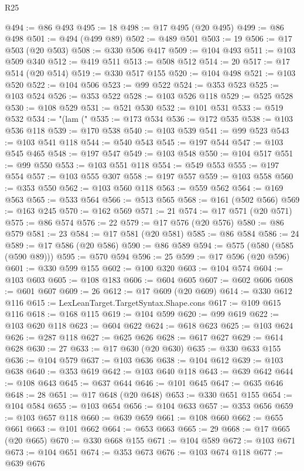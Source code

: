 \begin{lexlean}{R25}
\begin{coremodule}
@494 := @86 @493
@495 := 18
@498 := @17 @495 (@20 @495)
@499 := @86 @498
@501 := @494 (@499 @89)
@502 := @489 @501
@503 := 19
@506 := @17 @503 (@20 @503)
@508 := @330 @506 @417
@509 := @104 @493
@511 := @103 @509 @340
@512 := @419 @511
@513 := @508 @512
@514 := 20
@517 := @17 @514 (@20 @514)
@519 := @330 @517 @155
@520 := @104 @498
@521 := @103 @520
@522 := @104 @506
@523 := @99 @522
@524 := @353 @523
@525 := @103 @524
@526 := @353 @522
@528 := @103 @526 @118
@529 := @525 @528
@530 := @108 @529
@531 := @521 @530
@532 := @101 @531
@533 := @519 @532
@534 := "(lam ("
@535 := @173 @534
@536 := @172 @535
@538 := @103 @536 @118
@539 := @170 @538
@540 := @103 @539
@541 := @99 @523
@543 := @103 @541 @118
@544 := @540 @543
@545 := @197 @544
@547 := @103 @545 @465
@548 := @197 @547
@549 := @103 @548
@550 := @104 @517
@551 := @99 @550
@553 := @103 @551 @118
@554 := @549 @553
@555 := @197 @554
@557 := @103 @555 @307
@558 := @197 @557
@559 := @103 @558
@560 := @353 @550
@562 := @103 @560 @118
@563 := @559 @562
@564 := @169 @563
@565 := @533 @564
@566 := @513 @565
@568 := @161 (@502 @566)
@569 := @163 @245
@570 := @162 @569
@571 := 21
@574 := @17 @571 (@20 @571)
@575 := @86 @574
@576 := 22
@579 := @17 @576 (@20 @576)
@580 := @86 @579
@581 := 23
@584 := @17 @581 (@20 @581)
@585 := @86 @584
@586 := 24
@589 := @17 @586 (@20 @586)
@590 := @86 @589
@594 := @575 (@580 (@585 (@590 @89)))
@595 := @570 @594
@596 := 25
@599 := @17 @596 (@20 @596)
@601 := @330 @599 @155
@602 := @100 @320
@603 := @104 @574
@604 := @103 @603
@605 := @108 @183
@606 := @604 @605
@607 := @602 @606
@608 := @601 @607
@609 := 26
@612 := @17 @609 (@20 @609)
@614 := @330 @612 @116
@615 := LexLeanTarget.TargetSyntax.Shape.cons
@617 := @109 @615 @116
@618 := @168 @115
@619 := @104 @599
@620 := @99 @619
@622 := @103 @620 @118
@623 := @604 @622
@624 := @618 @623
@625 := @103 @624
@626 := @287 @118
@627 := @625 @626
@628 := @617 @627
@629 := @614 @628
@630 := 27
@633 := @17 @630 (@20 @630)
@635 := @330 @633 @155
@636 := @104 @579
@637 := @103 @636
@638 := @104 @612
@639 := @103 @638
@640 := @353 @619
@642 := @103 @640 @118
@643 := @639 @642
@644 := @108 @643
@645 := @637 @644
@646 := @101 @645
@647 := @635 @646
@648 := 28
@651 := @17 @648 (@20 @648)
@653 := @330 @651 @155
@654 := @104 @584
@655 := @103 @654
@656 := @104 @633
@657 := @353 @656
@659 := @103 @657 @118
@660 := @639 @659
@661 := @108 @660
@662 := @655 @661
@663 := @101 @662
@664 := @653 @663
@665 := 29
@668 := @17 @665 (@20 @665)
@670 := @330 @668 @155
@671 := @104 @589
@672 := @103 @671
@673 := @104 @651
@674 := @353 @673
@676 := @103 @674 @118
@677 := @639 @676

\end{coremodule}
\end{lexlean}
